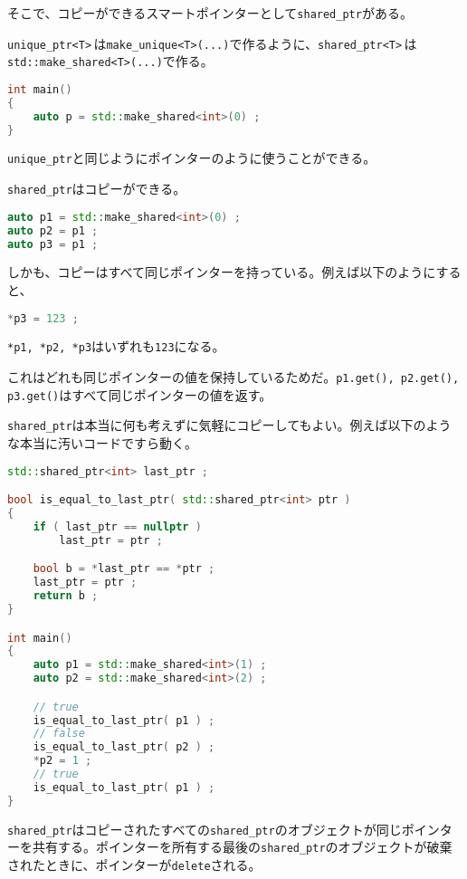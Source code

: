 そこで、コピーができるスマートポインターとして\texttt{shared\_ptr}がある。

\texttt{unique\_ptr<T>}\,は\texttt{make\_unique<T>(...)}で作るように、\texttt{shared\_ptr<T>}\,は\texttt{std::make\_shared{\allowbreak}<T>(...)}で作る。

\begin{lstlisting}[language={C++}]
int main()
{
    auto p = std::make_shared<int>(0) ;
}
\end{lstlisting}

\texttt{unique\_ptr}と同じようにポインターのように使うことができる。

\texttt{shared\_ptr}はコピーができる。

\begin{lstlisting}[language={C++}]
auto p1 = std::make_shared<int>(0) ;
auto p2 = p1 ;
auto p3 = p1 ;
\end{lstlisting}

しかも、コピーはすべて同じポインターを持っている。例えば以下のようにすると、
\begin{lstlisting}[language={C++}]
*p3 = 123 ;
\end{lstlisting}
\texttt{*p1, *p2, *p3}はいずれも\texttt{123}になる。

これはどれも同じポインターの値を保持しているためだ。\texttt{p1.get(), p2.get(), p3.get()}はすべて同じポインターの値を返す。

\texttt{shared\_ptr}は本当に何も考えずに気軽にコピーしてもよい。例えば以下のような本当に汚いコードですら動く。

\ifTombow\pagebreak\fi
\begin{lstlisting}[language={C++}]
std::shared_ptr<int> last_ptr ;

bool is_equal_to_last_ptr( std::shared_ptr<int> ptr )
{
    if ( last_ptr == nullptr )
        last_ptr = ptr ;

    bool b = *last_ptr == *ptr ;
    last_ptr = ptr ;
    return b ; 
}

int main()
{
    auto p1 = std::make_shared<int>(1) ;
    auto p2 = std::make_shared<int>(2) ;

    // true
    is_equal_to_last_ptr( p1 ) ;
    // false
    is_equal_to_last_ptr( p2 ) ;
    *p2 = 1 ;
    // true
    is_equal_to_last_ptr( p1 ) ;
}
\end{lstlisting}

\texttt{shared\_ptr}はコピーされたすべての\texttt{shared\_ptr}のオブジェクトが同じポインターを共有する。ポインターを所有する最後の\texttt{shared\_ptr}のオブジェクトが破棄されたときに、ポインターが\texttt{delete}される。

